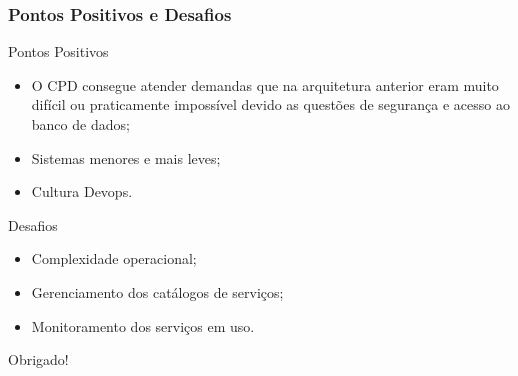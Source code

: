 \documentclass{beamer}
\begin{document}
\begin{frame}
  \frametitle{Pontos Positivos e Desafios}

  \begin{exampleblock}{Pontos Positivos}
  
	  \begin{itemize}
 	    \item<1->O CPD consegue atender demandas que na arquitetura anterior 
				 eram muito difícil ou praticamente impossível devido as questões de segurança e acesso ao banco de dados;
		\item<1->Sistemas menores e mais leves;
		\item<1->Cultura Devops.
	  \end{itemize}

  \end{exampleblock}


  \begin{exampleblock}{Desafios}
  
	  \begin{itemize}
 	    \item<1->Complexidade operacional;
		\item<1->Gerenciamento dos catálogos de serviços;
		\item<1->Monitoramento dos serviços em uso.
	  \end{itemize}

  \end{exampleblock}

  
\end{frame}


\begin{frame}[c]{ }
\centering
  \huge{Obrigado!}
\end{frame}
\end{document}
